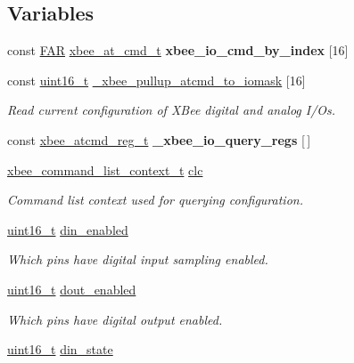 \subsection*{Variables}
\begin{DoxyCompactItemize}
\item 
const \hyperlink{group__hal_gaef060b3456fdcc093a7210a762d5f2ed}{F\-A\-R} \hyperlink{unionxbee__at__cmd__t}{xbee\-\_\-at\-\_\-cmd\-\_\-t} {\bfseries xbee\-\_\-io\-\_\-cmd\-\_\-by\-\_\-index} \mbox{[}16\mbox{]}
\item 
const \hyperlink{group__hal_ga5a8b2dc9e45a9ee81a94ef304fb62505}{uint16\-\_\-t} \hyperlink{group__xbee__io_gabcf9c9881057623ef7b28330631fad9b}{\-\_\-xbee\-\_\-pullup\-\_\-atcmd\-\_\-to\-\_\-iomask} \mbox{[}16\mbox{]}
\begin{DoxyCompactList}\small\item\em Read current configuration of X\-Bee digital and analog I/\-Os. \end{DoxyCompactList}\item 
const \hyperlink{structxbee__atcmd__reg__t}{xbee\-\_\-atcmd\-\_\-reg\-\_\-t} {\bfseries \-\_\-xbee\-\_\-io\-\_\-query\-\_\-regs} \mbox{[}$\,$\mbox{]}
\item 
\hypertarget{group__xbee__io_ga55f4e774c0eb8d8dfbcdb7f1faff5ef6}{\hyperlink{structxbee__command__list__context__t}{xbee\-\_\-command\-\_\-list\-\_\-context\-\_\-t} \hyperlink{group__xbee__io_ga55f4e774c0eb8d8dfbcdb7f1faff5ef6}{clc}}\label{group__xbee__io_ga55f4e774c0eb8d8dfbcdb7f1faff5ef6}

\begin{DoxyCompactList}\small\item\em Command list context used for querying configuration. \end{DoxyCompactList}\item 
\hyperlink{group__hal_ga5a8b2dc9e45a9ee81a94ef304fb62505}{uint16\-\_\-t} \hyperlink{group__xbee__io_gabf150485c21c63b46d511cb50b2bf2df}{din\-\_\-enabled}
\begin{DoxyCompactList}\small\item\em Which pins have digital input sampling enabled. \end{DoxyCompactList}\item 
\hyperlink{group__hal_ga5a8b2dc9e45a9ee81a94ef304fb62505}{uint16\-\_\-t} \hyperlink{group__xbee__io_gab9c5cc4d30d476f26698c96f9aa329fe}{dout\-\_\-enabled}
\begin{DoxyCompactList}\small\item\em Which pins have digital output enabled. \end{DoxyCompactList}\item 
\hypertarget{group__xbee__io_gaef89a704cd7723b8bac1e3f6f1abd71f}{\hyperlink{group__hal_ga5a8b2dc9e45a9ee81a94ef304fb62505}{uint16\-\_\-t} \hyperlink{group__xbee__io_gaef89a704cd7723b8bac1e3f6f1abd71f}{din\-\_\-state}}\label{group__xbee__io_gaef89a704cd7723b8bac1e3f6f1abd71f}


\end{DoxyCompactItemize}
